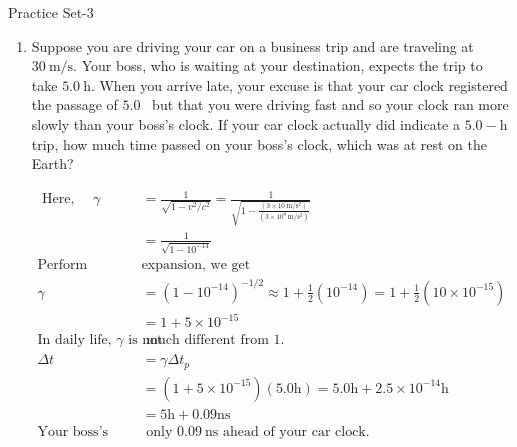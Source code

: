 \newpage
\begin{abox}
	Practice Set-3
\end{abox}
\begin{enumerate}[ label=\color{ocre}\textbf{\arabic*.}]

	\item Suppose you are driving your car on a business trip and are traveling at $30 \mathrm{~m} / \mathrm{s}$. Your boss, who is waiting at your destination, expects the trip to take $5.0 \mathrm{~h}$. When you arrive late, your excuse is that your car clock registered the passage of $5.0 $ \ but that you were driving fast and so your clock ran more slowly than your boss's clock. If your car clock actually did indicate a $5.0-\mathrm{h}$ trip, how much time passed on your boss's clock, which was at rest on the Earth?
	\begin{answer}
		\begin{align*}
		\text{	Here, }\quad \gamma&=\frac{1}{\sqrt{1-v^{2} / c^{2}}}=\frac{1}{\sqrt{1-\frac{\left(3 \times 10\  \text{m}/\text{s}^{2}\right)}{\left(3 \times 10^{8} \mathrm{~m} / \mathrm{s}^2\right)}}}\\&=\frac{1}{\sqrt{1-10^{-14}}}\\
		\text{Perform binomial }&\text{expansion, we get}\\
		\gamma&=\left(1-10^{-14}\right)^{-1 / 2} \approx 1+\frac{1}{2}\left(10^{-14}\right)=1+\frac{1}{2}\left(10\times 10^{-15}\right) \\&=1+5 \times 10^{-15}\\
		\text{In daily life, $\gamma$ is not}&\text{ much different from $1$.}\\
		\Delta t&=\gamma \Delta t_{p}\\&=\left(1+5 \times 10^{-15}\right)(5.0 \text{h})=5.0 \text{h}+2.5 \times 10^{-14} \text{h}\\&=5\text{h}+0.09 \mathrm{ns}\\
		\text{Your boss's clock would be}&\text{ only $0.09 \mathrm{~ns}$ ahead of your car clock. }
		\end{align*}
	\end{answer}
	

\end{enumerate}

